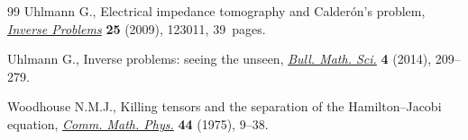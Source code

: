 \documentclass[pdftex]{sigma}
\numberwithin{equation}{section}
\begin{document}
\begin{thebibliography}{99}
Uhlmann G., Electrical impedance tomography and {C}alder\'{o}n's problem,
 \href{https://doi.org/10.1088/0266-5611/25/12/123011}{\textit{Inverse Problems}} \textbf{25} (2009), 123011, 39~pages.

Uhlmann G., Inverse problems: seeing the unseen, \href{https://doi.org/10.1007/s13373-014-0051-9}{\textit{Bull. Math. Sci.}}
 \textbf{4} (2014), 209--279.

Woodhouse N.M.J., Killing tensors and the separation of the
 {H}amilton--{J}acobi equation, \href{https://doi.org/10.1007/BF01609055}{\textit{Comm. Math. Phys.}} \textbf{44} (1975),
 9--38.

\end{thebibliography}\LastPageEnding
\end{document}
